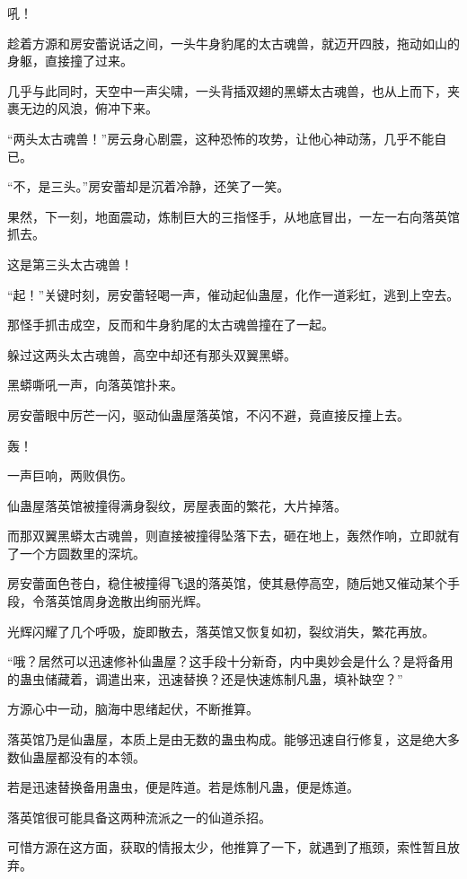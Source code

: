 
\begin{this_body}

吼！

趁着方源和房安蕾说话之间，一头牛身豹尾的太古魂兽，就迈开四肢，拖动如山的身躯，直接撞了过来。

几乎与此同时，天空中一声尖啸，一头背插双翅的黑蟒太古魂兽，也从上而下，夹裹无边的风浪，俯冲下来。

“两头太古魂兽！”房云身心剧震，这种恐怖的攻势，让他心神动荡，几乎不能自已。

“不，是三头。”房安蕾却是沉着冷静，还笑了一笑。

果然，下一刻，地面震动，炼制巨大的三指怪手，从地底冒出，一左一右向落英馆抓去。

这是第三头太古魂兽！

“起！”关键时刻，房安蕾轻喝一声，催动起仙蛊屋，化作一道彩虹，逃到上空去。

那怪手抓击成空，反而和牛身豹尾的太古魂兽撞在了一起。

躲过这两头太古魂兽，高空中却还有那头双翼黑蟒。

黑蟒嘶吼一声，向落英馆扑来。

房安蕾眼中厉芒一闪，驱动仙蛊屋落英馆，不闪不避，竟直接反撞上去。

轰！

一声巨响，两败俱伤。

仙蛊屋落英馆被撞得满身裂纹，房屋表面的繁花，大片掉落。

而那双翼黑蟒太古魂兽，则直接被撞得坠落下去，砸在地上，轰然作响，立即就有了一个方圆数里的深坑。

房安蕾面色苍白，稳住被撞得飞退的落英馆，使其悬停高空，随后她又催动某个手段，令落英馆周身逸散出绚丽光辉。

光辉闪耀了几个呼吸，旋即散去，落英馆又恢复如初，裂纹消失，繁花再放。

“哦？居然可以迅速修补仙蛊屋？这手段十分新奇，内中奥妙会是什么？是将备用的蛊虫储藏着，调遣出来，迅速替换？还是快速炼制凡蛊，填补缺空？”

方源心中一动，脑海中思绪起伏，不断推算。

落英馆乃是仙蛊屋，本质上是由无数的蛊虫构成。能够迅速自行修复，这是绝大多数仙蛊屋都没有的本领。

若是迅速替换备用蛊虫，便是阵道。若是炼制凡蛊，便是炼道。

落英馆很可能具备这两种流派之一的仙道杀招。

可惜方源在这方面，获取的情报太少，他推算了一下，就遇到了瓶颈，索性暂且放弃。


\end{this_body}
